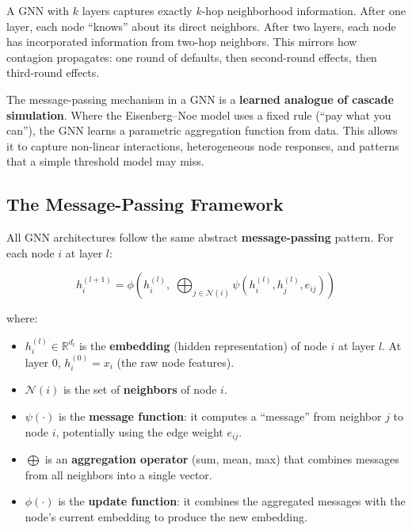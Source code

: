 \documentclass[11pt, a4paper]{article}
\theoremstyle{definition}
\theoremstyle{plain}
\theoremstyle{remark}
\newcommand{\RV}{\mathbb{R}}
\begin{document}
A GNN with $k$ layers captures exactly $k$-hop neighborhood information.
After one layer, each node ``knows'' about its direct neighbors.
After two layers, each node has incorporated information from two-hop neighbors.
This mirrors how contagion propagates: one round of defaults, then second-round
effects, then third-round effects.

\begin{keyidea}
The message-passing mechanism in a GNN is a \textbf{learned analogue of cascade
simulation}.
Where the Eisenberg--Noe model uses a fixed rule (``pay what you can''),
the GNN learns a parametric aggregation function from data.
This allows it to capture non-linear interactions, heterogeneous node responses,
and patterns that a simple threshold model may miss.
\end{keyidea}

\subsection{The Message-Passing Framework}

All GNN architectures follow the same abstract \textbf{message-passing} pattern.
For each node $i$ at layer $l$:

\begin{equation}\label{eq:message-passing}
    h_i^{(l+1)} = \phi\!\left(h_i^{(l)},\; \bigoplus_{j \in \mathcal{N}(i)} \psi\!\left(h_i^{(l)}, h_j^{(l)}, e_{ij}\right)\right)
\end{equation}

where:
\begin{itemize}
    \item $h_i^{(l)} \in \RV^{d_l}$ is the \textbf{embedding} (hidden representation) of
          node $i$ at layer $l$.
          At layer 0, $h_i^{(0)} = x_i$ (the raw node features).
    \item $\mathcal{N}(i)$ is the set of \textbf{neighbors} of node $i$.
    \item $\psi(\cdot)$ is the \textbf{message function}: it computes a ``message''
          from neighbor $j$ to node $i$, potentially using the edge weight $e_{ij}$.
    \item $\bigoplus$ is an \textbf{aggregation operator} (sum, mean, max) that
          combines messages from all neighbors into a single vector.
    \item $\phi(\cdot)$ is the \textbf{update function}: it combines the aggregated
          messages with the node's current embedding to produce the new embedding.
\end{itemize}
\end{document}

